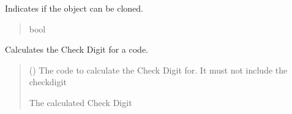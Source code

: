 \documentclass[letterpaper,10pt,english]{sphinxmanual}
\begin{document}
\begin{fulllineitems}
\begin{fulllineitems}
\end{fulllineitems}


\begin{fulllineitems}
\label{\detokenize{apache_commons_validator_python.routines.checkdigit:apache_commons_validator_python.routines.checkdigit.checkdigit.CheckDigit.clone}}
\pysigstartsignatures
{}
\pysigstopsignatures
\sphinxAtStartPar
Indicates if the object can be cloned.
\begin{quote}\begin{description}
\sphinxAtStartPar
bool

\end{description}\end{quote}

\end{fulllineitems}


\begin{fulllineitems}
\label{\detokenize{apache_commons_validator_python.routines.checkdigit:apache_commons_validator_python.routines.checkdigit.checkdigit.CheckDigit.calculate}}
\pysigstartsignatures
{}
\pysigstopsignatures
\sphinxAtStartPar
Calculates the Check Digit for a code.
\begin{quote}\begin{description}
\sphinxAtStartPar
{} () \textendash{} The code to calculate the Check Digit for.  It must not include the checkdigit

\sphinxAtStartPar
The calculated Check Digit


\end{description}
\end{quote}
\end{fulllineitems}
\end{fulllineitems}
\end{document}

